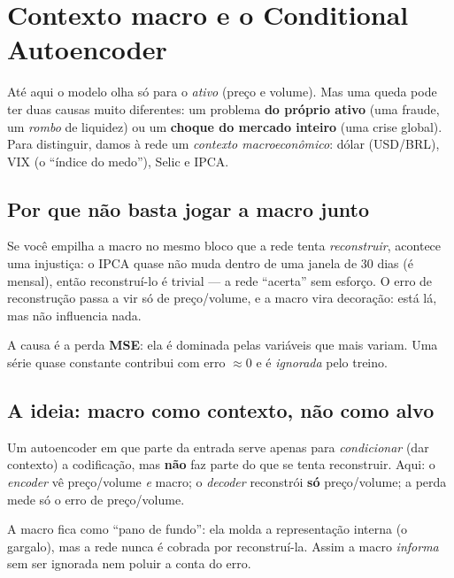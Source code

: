 \section{Contexto macro e o Conditional Autoencoder}
\label{sec:cond-macro}

Até aqui o modelo olha só para o \emph{ativo} (preço e volume). Mas uma queda pode ter duas causas
muito diferentes: um problema \textbf{do próprio ativo} (uma fraude, um \emph{rombo} de liquidez)
ou um \textbf{choque do mercado inteiro} (uma crise global). Para distinguir, damos à rede um
\emph{contexto macroeconômico}: dólar (USD/BRL), VIX (o ``índice do medo''), Selic e IPCA.

\subsection{Por que não basta jogar a macro junto}
\label{sec:cond-juntar}

\begin{intuicao}
Se você empilha a macro no mesmo bloco que a rede tenta \emph{reconstruir}, acontece uma injustiça:
o IPCA quase não muda dentro de uma janela de 30 dias (é mensal), então reconstruí-lo é trivial ---
a rede ``acerta'' sem esforço. O erro de reconstrução passa a vir só de preço/volume, e a macro
vira decoração: está lá, mas não influencia nada.
\end{intuicao}

A causa é a perda \textbf{MSE}: ela é dominada pelas variáveis que mais variam. Uma série quase
constante contribui com erro $\approx 0$ e é \emph{ignorada} pelo treino.

\subsection{A ideia: macro como contexto, não como alvo}
\label{sec:cond-ideia}

\begin{definicao}
Um autoencoder em que parte da entrada serve apenas para \emph{condicionar} (dar contexto) a
codificação, mas \textbf{não} faz parte do que se tenta reconstruir. Aqui: o \emph{encoder} vê
preço/volume \emph{e} macro; o \emph{decoder} reconstrói \textbf{só} preço/volume; a perda mede só
o erro de preço/volume.
\end{definicao}

\begin{intuicao}
A macro fica como ``pano de fundo'': ela molda a representação interna (o gargalo), mas a rede nunca
é cobrada por reconstruí-la. Assim a macro \emph{informa} sem ser ignorada nem poluir a conta do
erro.
\end{intuicao}

